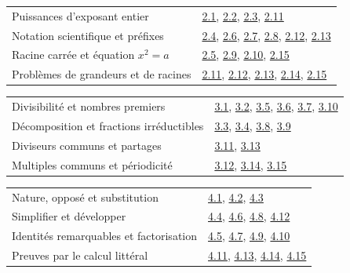 \begin{tabularx}{\linewidth}{@{}Yl@{}}\toprule
Puissances d’exposant entier & \hyperref[exo-2-1]{2.1}, \hyperref[exo-2-2]{2.2}, \hyperref[exo-2-3]{2.3}, \hyperref[exo-2-11]{2.11}\\[2mm]
Notation scientifique et préfixes & \hyperref[exo-2-4]{2.4}, \hyperref[exo-2-6]{2.6}, \hyperref[exo-2-7]{2.7}, \hyperref[exo-2-8]{2.8}, \hyperref[exo-2-12]{2.12}, \hyperref[exo-2-13]{2.13}\\[2mm]
Racine carrée et équation $x^2=a$ & \hyperref[exo-2-5]{2.5}, \hyperref[exo-2-9]{2.9}, \hyperref[exo-2-10]{2.10}, \hyperref[exo-2-15]{2.15}\\[2mm]
Problèmes de grandeurs et de racines & \hyperref[exo-2-11]{2.11}, \hyperref[exo-2-12]{2.12}, \hyperref[exo-2-13]{2.13}, \hyperref[exo-2-14]{2.14}, \hyperref[exo-2-15]{2.15}\\[2mm]
\bottomrule\end{tabularx}\par\vspace{4mm}
\begin{tabularx}{\linewidth}{@{}Yl@{}}\toprule
Divisibilité et nombres premiers & \hyperref[exo-3-1]{3.1}, \hyperref[exo-3-2]{3.2}, \hyperref[exo-3-5]{3.5}, \hyperref[exo-3-6]{3.6}, \hyperref[exo-3-7]{3.7}, \hyperref[exo-3-10]{3.10}\\[2mm]
Décomposition et fractions irréductibles & \hyperref[exo-3-3]{3.3}, \hyperref[exo-3-4]{3.4}, \hyperref[exo-3-8]{3.8}, \hyperref[exo-3-9]{3.9}\\[2mm]
Diviseurs communs et partages & \hyperref[exo-3-11]{3.11}, \hyperref[exo-3-13]{3.13}\\[2mm]
Multiples communs et périodicité & \hyperref[exo-3-12]{3.12}, \hyperref[exo-3-14]{3.14}, \hyperref[exo-3-15]{3.15}\\[2mm]
\bottomrule\end{tabularx}\par\vspace{4mm}
\clearpage
{}\fontsize{10}{13}\selectfont
{}\begin{tabularx}{\linewidth}{@{}Yl@{}}\toprule
Nature, opposé et substitution & \hyperref[exo-4-1]{4.1}, \hyperref[exo-4-2]{4.2}, \hyperref[exo-4-3]{4.3}\\[2mm]
Simplifier et développer & \hyperref[exo-4-4]{4.4}, \hyperref[exo-4-6]{4.6}, \hyperref[exo-4-8]{4.8}, \hyperref[exo-4-12]{4.12}\\[2mm]
Identités remarquables et factorisation & \hyperref[exo-4-5]{4.5}, \hyperref[exo-4-7]{4.7}, \hyperref[exo-4-9]{4.9}, \hyperref[exo-4-10]{4.10}\\[2mm]
Preuves par le calcul littéral & \hyperref[exo-4-11]{4.11}, \hyperref[exo-4-13]{4.13}, \hyperref[exo-4-14]{4.14}, \hyperref[exo-4-15]{4.15}\\[2mm]
\bottomrule\end{tabularx}\par\vspace{4mm}

